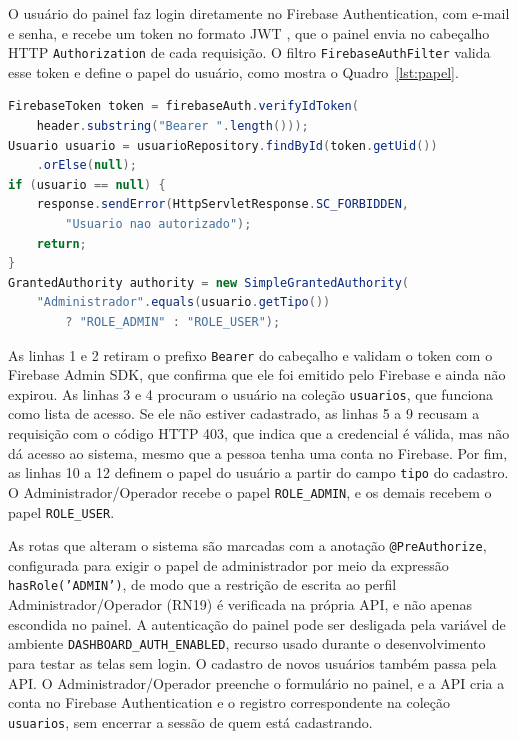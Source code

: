 O usuário do painel faz login diretamente no Firebase Authentication, com e-mail e senha, e recebe um token no formato JWT \cite{firebaseauth2026,rfc7519}, que o painel envia no cabeçalho HTTP \texttt{Authorization} de cada requisição. O filtro \texttt{FirebaseAuthFilter} valida esse token e define o papel do usuário, como mostra o Quadro~\ref{lst:papel}.

\vspace{0.6\baselineskip}
\noindent\begin{minipage}{\linewidth}
\begin{lstlisting}[language=Java, caption={Definição do papel do usuário (trecho de FirebaseAuthFilter)}, label={lst:papel}]
FirebaseToken token = firebaseAuth.verifyIdToken(
    header.substring("Bearer ".length()));
Usuario usuario = usuarioRepository.findById(token.getUid())
    .orElse(null);
if (usuario == null) {
    response.sendError(HttpServletResponse.SC_FORBIDDEN,
        "Usuario nao autorizado");
    return;
}
GrantedAuthority authority = new SimpleGrantedAuthority(
    "Administrador".equals(usuario.getTipo())
        ? "ROLE_ADMIN" : "ROLE_USER");
\end{lstlisting}
\vspace{-0.5\baselineskip}
\end{minipage}
\medskip

As linhas 1 e 2 retiram o prefixo \texttt{Bearer} do cabeçalho e validam o token com o Firebase Admin SDK, que confirma que ele foi emitido pelo Firebase e ainda não expirou. As linhas 3 e 4 procuram o usuário na coleção \texttt{usuarios}, que funciona como lista de acesso. Se ele não estiver cadastrado, as linhas 5 a 9 recusam a requisição com o código HTTP 403, que indica que a credencial é válida, mas não dá acesso ao sistema, mesmo que a pessoa tenha uma conta no Firebase. Por fim, as linhas 10 a 12 definem o papel do usuário a partir do campo \texttt{tipo} do cadastro. O Administrador/Operador recebe o papel \texttt{ROLE\_ADMIN}, e os demais recebem o papel \texttt{ROLE\_USER}.

As rotas que alteram o sistema são marcadas com a anotação \texttt{@PreAuthorize}, configurada para exigir o papel de administrador por meio da expressão \texttt{hasRole('ADMIN')}, de modo que a restrição de escrita ao perfil Administrador/Operador (RN19) é verificada na própria API, e não apenas escondida no painel. A autenticação do painel pode ser desligada pela variável de ambiente \texttt{DASHBOARD\_\allowbreak AUTH\_\allowbreak ENABLED}, recurso usado durante o desenvolvimento para testar as telas sem login. %
O cadastro de novos usuários também passa pela API. O Administrador/Operador preenche o formulário no painel, e a API cria a conta no Firebase Authentication e o registro correspondente na coleção \texttt{usuarios}, sem encerrar a sessão de quem está cadastrando.


